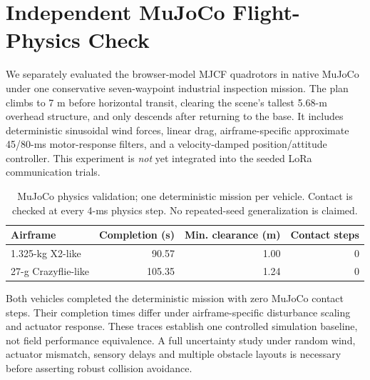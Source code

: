 \documentclass[conference]{IEEEtran}
\begin{document}
\section{Independent MuJoCo Flight-Physics Check}
We separately evaluated the browser-model MJCF quadrotors in native MuJoCo under one conservative seven-waypoint industrial inspection mission. The plan climbs to 7 m before horizontal transit, clearing the scene's tallest 5.68-m overhead structure, and only descends after returning to the base. It includes deterministic sinusoidal wind forces, linear drag, airframe-specific approximate 45/80-ms motor-response filters, and a velocity-damped position/attitude controller. This experiment is \emph{not} yet integrated into the seeded LoRa communication trials.
\begin{table}[t]\centering
\caption{MuJoCo physics validation; one deterministic mission per vehicle. Contact is checked at every 4-ms physics step. No repeated-seed generalization is claimed.}\label{tab:flight}
\begin{tabular}{lrrr}\toprule
Airframe & Completion (s) & Min. clearance (m) & Contact steps\\\midrule
1.325-kg X2-like & 90.57 & 1.00 & 0\\
27-g Crazyflie-like & 105.35 & 1.24 & 0\\
\bottomrule\end{tabular}\end{table}
Both vehicles completed the deterministic mission with zero MuJoCo contact steps. Their completion times differ under airframe-specific disturbance scaling and actuator response. These traces establish one controlled simulation baseline, not field performance equivalence. A full uncertainty study under random wind, actuator mismatch, sensory delays and multiple obstacle layouts is necessary before asserting robust collision avoidance.
\end{document}
